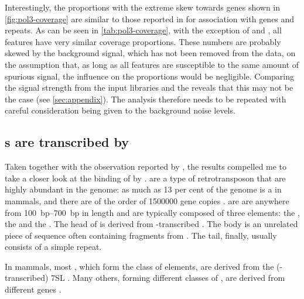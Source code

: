 Interestingly, the proportions with the extreme skew towards \trna genes shown
in \cref{fig:pol3-coverage} are similar to those reported in
\citet{Raha:2010,Canella:2012} for  association with  genes and
repeats. As can be seen in \cref{tab:pol3-coverage}, with the exception of \rrna
and , all features have very similar coverage proportions. These
numbers are probably skewed by the  \chipseq background signal, which has
not been removed from the data, on the assumption that, as long as all features
are susceptible to the same amount of spurious signal, the influence on the
proportions would be negligible. Comparing the signal strength from the input
libraries and the  \chip reveals that this may not be the case (see
\cref{sec:appendix}). The analysis therefore needs to be repeated with careful
consideration being given to the background noise levels.

\subsection{s are transcribed by }

Taken together with the observation reported by \citet{Carriere:2012}, the
results compelled me to take a closer look at the binding of \transsine by
. \transsine[s] are a type of retrotransposon that are highly abundant in
the genome: as much as \num{13} per cent of the genome is a \transsine in
mammals, and there are of the order of \num{1500000} gene copies
\citep{Lander:2001}. \transsine[s] are are anywhere from \SIrange{100}{700}{bp}
in length and are typically composed of three elements: the , the
 and the . The head of \transsine[s] is derived from
-transcribed \rna[s]. The body is an unrelated piece of sequence often
containing fragments from \transline[s]. The tail, finally, usually consists of
a simple repeat.

In mammals, most \transsine[s], which form the class of  elements,
are derived from the (-transcribed) 7SL \ncrna. Many others, forming
different classes of \transsine[s], are derived from different \trna genes
\citep{Vassetzky:2013}.


